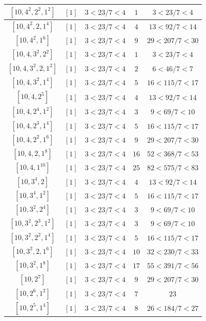 \documentclass{article}%
\begin{document}
\begin{center}
\begin{longtable}{||c|c|c|c|c||}
$[10, 4^{2}, 2^{2}, 1^{2}]$ & $[1]$ & $3 < 23/7 < 4$ & $1$ & $3 < 23/7 < 4$ \\ \hline 
$[10, 4^{2}, 2, 1^{4}]$ & $[1]$ & $3 < 23/7 < 4$ & $4$ & $13 < 92/7 < 14$ \\ \hline 
$[10, 4^{2}, 1^{6}]$ & $[1]$ & $3 < 23/7 < 4$ & $9$ & $29 < 207/7 < 30$ \\ \hline 
$[10, 4, 3^{2}, 2^{2}]$ & $[1]$ & $3 < 23/7 < 4$ & $1$ & $3 < 23/7 < 4$ \\ \hline 
$[10, 4, 3^{2}, 2, 1^{2}]$ & $[1]$ & $3 < 23/7 < 4$ & $2$ & $6 < 46/7 < 7$ \\ \hline 
$[10, 4, 3^{2}, 1^{4}]$ & $[1]$ & $3 < 23/7 < 4$ & $5$ & $16 < 115/7 < 17$ \\ \hline 
$[10, 4, 2^{5}]$ & $[1]$ & $3 < 23/7 < 4$ & $4$ & $13 < 92/7 < 14$ \\ \hline 
$[10, 4, 2^{4}, 1^{2}]$ & $[1]$ & $3 < 23/7 < 4$ & $3$ & $9 < 69/7 < 10$ \\ \hline 
$[10, 4, 2^{3}, 1^{4}]$ & $[1]$ & $3 < 23/7 < 4$ & $5$ & $16 < 115/7 < 17$ \\ \hline 
$[10, 4, 2^{2}, 1^{6}]$ & $[1]$ & $3 < 23/7 < 4$ & $9$ & $29 < 207/7 < 30$ \\ \hline 
$[10, 4, 2, 1^{8}]$ & $[1]$ & $3 < 23/7 < 4$ & $16$ & $52 < 368/7 < 53$ \\ \hline 
$[10, 4, 1^{10}]$ & $[1]$ & $3 < 23/7 < 4$ & $25$ & $82 < 575/7 < 83$ \\ \hline 
$[10, 3^{4}, 2]$ & $[1]$ & $3 < 23/7 < 4$ & $4$ & $13 < 92/7 < 14$ \\ \hline 
$[10, 3^{4}, 1^{2}]$ & $[1]$ & $3 < 23/7 < 4$ & $5$ & $16 < 115/7 < 17$ \\ \hline 
$[10, 3^{2}, 2^{4}]$ & $[1]$ & $3 < 23/7 < 4$ & $3$ & $9 < 69/7 < 10$ \\ \hline 
$[10, 3^{2}, 2^{3}, 1^{2}]$ & $[1]$ & $3 < 23/7 < 4$ & $3$ & $9 < 69/7 < 10$ \\ \hline 
$[10, 3^{2}, 2^{2}, 1^{4}]$ & $[1]$ & $3 < 23/7 < 4$ & $5$ & $16 < 115/7 < 17$ \\ \hline 
$[10, 3^{2}, 2, 1^{6}]$ & $[1]$ & $3 < 23/7 < 4$ & $10$ & $32 < 230/7 < 33$ \\ \hline 
$[10, 3^{2}, 1^{8}]$ & $[1]$ & $3 < 23/7 < 4$ & $17$ & $55 < 391/7 < 56$ \\ \hline 
$[10, 2^{7}]$ & $[1]$ & $3 < 23/7 < 4$ & $9$ & $29 < 207/7 < 30$ \\ \hline 
$[10, 2^{6}, 1^{2}]$ & $[1]$ & $3 < 23/7 < 4$ & $7$ & $23$ \\ \hline 
$[10, 2^{5}, 1^{4}]$ & $[1]$ & $3 < 23/7 < 4$ & $8$ & $26 < 184/7 < 27$ \\ \hline 

\end{longtable}
\end{center}
\end{document}
